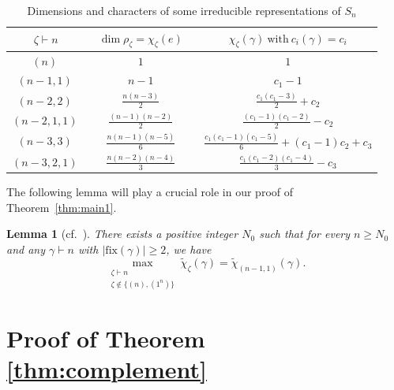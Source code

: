 \documentclass[12pt, a4paper]{article}
\def\fix{\mathrm{fix}}
\newtheorem{lem}[thm]{Lemma}
\theoremstyle{definition}
\begin{document}
\begin{table}[ht]
\centering
\begin{tabular}{c c c}
\toprule
$~~~~\zeta\vdash n~~~$ & $~~~~\dim \rho_\zeta=\chi_\zeta(e)~~~~$ & $~~~~\chi_\zeta(\gamma)~\text{with}~c_i(\gamma)=c_i~~~~$\\\toprule
$(n)$ & $1$ & $1$\\ \midrule
$(n-1,1)$ & $n-1$ & $c_1-1$\\\midrule
$(n-2,2)$ & $\frac{n(n-3)}{2}$ & $\frac{c_1(c_1-3)}{2}+c_2$\\\midrule
$(n-2,1,1)$& $\frac{(n-1)(n-2)}{2}$ & $\frac{(c_1-1)(c_1-2)}{2}-c_2$\\ \midrule
$(n-3,3)$& $\frac{n(n-1)(n-5)}{6}$ & $\frac{c_1(c_1-1)(c_1-5)}{6}+(c_1-1)c_2+c_3$\\ \midrule
$(n-3,2,1)$ & $\frac{n(n-2)(n-4)}{3}$ & $\frac{c_1(c_1-2)(c_1-4)}{3}-c_3$ \\ 
\bottomrule
\end{tabular}
\vspace{0.2cm}
\caption{Dimensions and characters of some irreducible representations of $S_n$}
\label{tab:tab1}
\end{table}

The following lemma will play a crucial role in our proof of Theorem~\ref{thm:main1}.

\begin{lem}[cf.~{\cite[Proposition 2.3]{PP}}]\label{PPmax}
There exists a positive integer $N_0$ such that for every $n\ge N_0$ and any $\gamma\vdash n$ with $|\fix(\gamma)| \geq 2$, we have $$\max_{\substack{\zeta\vdash n \\ \zeta \notin \{(n), (1^n)\}}} \tilde{\chi}_\zeta(\gamma)=\tilde{\chi}_{(n-1,1)}(\gamma).$$ 
\end{lem}




\section{Proof of Theorem \ref{thm:complement}}
\label{sec:complements}
\end{document}
